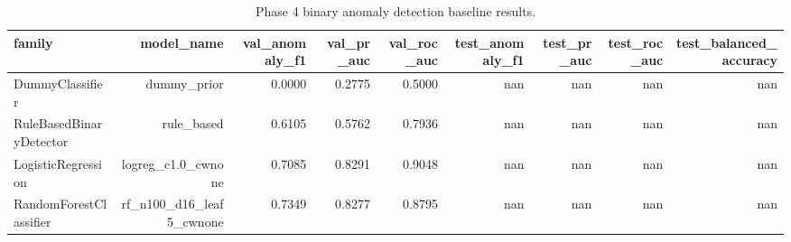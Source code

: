 \begin{table}[t]
\centering
\caption{Phase 4 binary anomaly detection baseline results.}
\label{tab:phase4_binary_main}
\begin{tabular}{lrrrrrrrr}
\hline
family & model\_name & val\_anomaly\_f1 & val\_pr\_auc & val\_roc\_auc & test\_anomaly\_f1 & test\_pr\_auc & test\_roc\_auc & test\_balanced\_accuracy \\
\hline
DummyClassifier & dummy\_prior & 0.0000 & 0.2775 & 0.5000 & nan & nan & nan & nan \\
RuleBasedBinaryDetector & rule\_based & 0.6105 & 0.5762 & 0.7936 & nan & nan & nan & nan \\
LogisticRegression & logreg\_c1.0\_cwnone & 0.7085 & 0.8291 & 0.9048 & nan & nan & nan & nan \\
RandomForestClassifier & rf\_n100\_d16\_leaf5\_cwnone & 0.7349 & 0.8277 & 0.8795 & nan & nan & nan & nan \\
\hline
\end{tabular}
\end{table}
